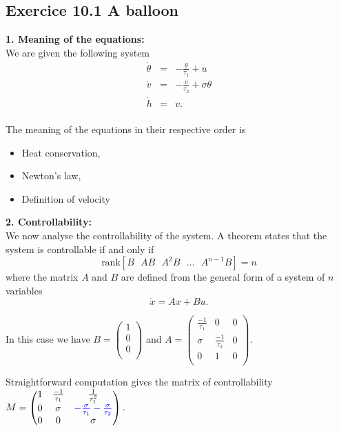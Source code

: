 
\subsection*{Exercice 10.1 A balloon}

\textbf{1. Meaning of the equations:}\\

We are given the following system
$$\begin{array}{lll}
\dot{\theta} & = & -\frac{\theta}{\tau_{1}}+u\\
\dot{v} & = & -\frac{v}{\tau_{2}}+\sigma\theta \\
\dot{h} & = & v.\\
\end{array}$$

The meaning of the equations in their respective order is
\begin{itemize}
\item Heat conservation,
\item Newton's law,
\item Definition of velocity
\end{itemize}


\textbf{2. Controllability:}\\

We now analyse the controllability of the system. A theorem states that the system is controllable if and only if 
$$\text{rank}[B \text{  } AB\text{  } A^{2}B \text{  }\dots\text{  } A^{n-1}B]=n$$
where the matrix $A$ and $B$ are defined from the general form of a system of $n$ variables
$$\dot{x}=Ax+Bu.$$

In this case we have $B=\begin{pmatrix}
1\\
0\\
0\\
\end{pmatrix}$ and $A=\begin{pmatrix}
\frac{-1}{\tau_{1}} & 0 & 0\\
\sigma & \frac{-1}{\tau_{2}} & 0 \\
0 & 1 & 0 \\
\end{pmatrix}.$

Straightforward computation gives the matrix of controllability $M=\begin{pmatrix}
1      & \frac{-1}{\tau_{1}} & \frac{1}{\tau_{1}^{2}}\\
0 & \sigma & \textcolor{blue}{-\frac{\sigma}{\tau_{1}}-\frac{\sigma}{\tau_{2}}} \\
0      & 0 & \sigma \\
\end{pmatrix}.$

